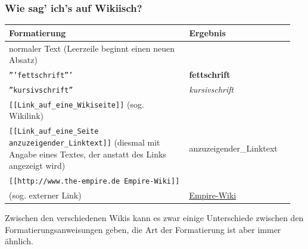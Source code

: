 \documentclass{beamer}
\begin{document}
\begin{frame}
  \frametitle{Wie sag’ ich’s auf Wikiisch?}
  
  \begin{tabular}{|p{0.60\linewidth}|p{0.35\linewidth}|}
    \toprule
    \textbf{Formatierung } & \textbf{Ergebnis } \\ 
    \midrule
     
    normaler Text\newline
    (Leerzeile beginnt einen neuen Absatz) & \\ 

    \midrule
 
    \texttt{'''fettschrift'''} & \textbf{fettschrift} \\ 

    \midrule
     
    \texttt{''kursivschrift''} & \emph{kursivschrift} \\ 

    \midrule
     
    \texttt{[[Link\_auf\_eine\_Wikiseite]]}\newline
    (sog. Wikilink) & \\ 

    \midrule
    
    \texttt{[[Link\_auf\_eine\_Seite anzuzeigender\_Linktext]]}\newline
    (diesmal mit Angabe eines Textes, der anstatt des Links angezeigt wird)
                           &  anzuzeigender\_Linktext \\ 

    \midrule
     
    \texttt{[[http://www.the-empire.de Empire-Wiki]]}\\
    (sog. externer Link) & \href{http://www.the-empire.de}{Empire-Wiki} \\ 

    \bottomrule
  \end{tabular}
  
  Zwischen den verschiedenen Wikis kann es zwar einige Unterschiede zwischen den
  Formatierungsanweisungen geben, die Art der Formatierung ist aber immer
  ähnlich.
\end{frame}
\end{document}
